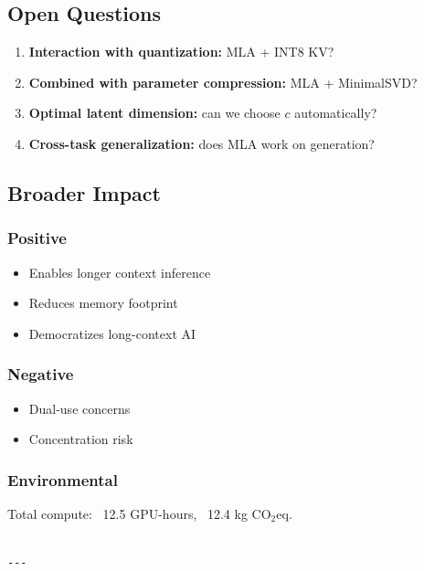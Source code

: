 \subsection{Open Questions}

\begin{enumerate}
\item \textbf{Interaction with quantization:} MLA + INT8 KV?
\item \textbf{Combined with parameter compression:} MLA + MinimalSVD?
\item \textbf{Optimal latent dimension:} can we choose $c$ automatically?
\item \textbf{Cross-task generalization:} does MLA work on generation?

\end{enumerate}
\subsection{Broader Impact}

\subsubsection{Positive}
\begin{itemize}
\item Enables longer context inference
\item Reduces memory footprint
\item Democratizes long-context AI

\end{itemize}
\subsubsection{Negative}
\begin{itemize}
\item Dual-use concerns
\item Concentration risk

\end{itemize}
\subsubsection{Environmental}
Total compute: ~12.5 GPU-hours, ~12.4 kg CO$_2$eq.
\begin{lstlisting}

---
\end{lstlisting}